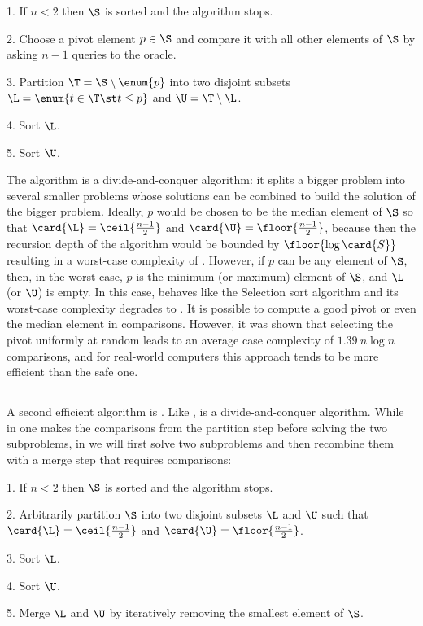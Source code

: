 \begin{algorithm}
\item[1.] If \(n < 2\) then \(\S\) is sorted and the algorithm stops.
\item[2.] Choose a pivot element \(p \in \S\) and compare it with all other
elements of \(\S\) by asking \(n - 1\) queries to the oracle.
\item[3.] Partition \(\T = \S \setminus \enum{p}\) into two disjoint subsets
\(\L = \enum{t \in \T \st t \le p}\) and \(\U = \T \setminus \L\).
\item[4.] Sort \(\L\).
\item[5.] Sort \(\U\).
\end{algorithm}

The \quicksort algorithm is a divide-and-conquer algorithm: it splits a bigger
problem into several smaller problems whose solutions can be combined to build
the solution of the bigger problem. Ideally, \(p\) would be chosen to be the
median element of \(\S\) so that \(\card{\L} = \ceil{\frac{n-1}{2}}\) and
\(\card{\U} = \floor{\frac{n-1}{2}}\), because then the recursion depth of the
algorithm would be bounded by \(\floor{\log \card{S}}\) resulting in a
worst-case complexity of . However, if \(p\) can be any element
of \(\S\), then, in the worst case, \(p\) is the minimum (or maximum) element of
\(\S\), and \(\L\) (or \(\U\)) is empty. In this case, \quicksort behaves like
the Selection sort algorithm and its worst-case complexity degrades to
. It is possible \cite{blum:1973} to compute a good pivot or even the
median element in  comparisons. However, it was shown \cite{hoare:1962}
that selecting the pivot uniformly at random leads to an average case
complexity of \(1.39~n \log n\) comparisons, and for real-world computers this
approach tends to be more efficient than the safe one.

\subsection*{\mergesort}

A second efficient algorithm is \mergesort
\cite{goldstine:1948,leiserson:2001}. Like \quicksort, \mergesort is a
divide-and-conquer algorithm. While in \quicksort one makes the comparisons from
the partition step before solving the two subproblems, in \mergesort we will
first solve two subproblems and then recombine them with a merge step that
requires  comparisons:

\begin{algorithm}
\item[1.] If \(n < 2\) then \(\S\) is sorted and the algorithm stops.
\item[2.] Arbitrarily partition \(\S\) into two disjoint subsets \(\L\) and
\(\U\) such that \(\card{\L} = \ceil{\frac{n-1}{2}}\) and \(\card{\U} =
\floor{\frac{n-1}{2}}\).
\item[3.] Sort \(\L\).
\item[4.] Sort \(\U\).
\item[5.] Merge \(\L\) and \(\U\) by iteratively removing the smallest element
of \(\S\).
\end{algorithm}

